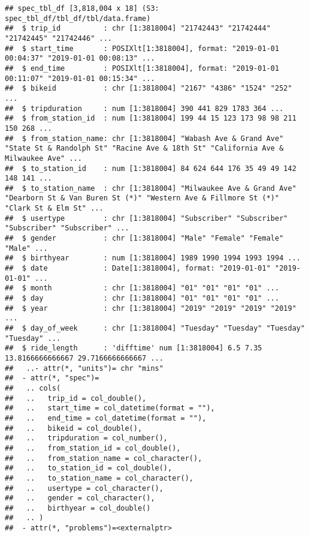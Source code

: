 \documentclass[
]{article}
\newenvironment{Shaded}{\begin{snugshade}}{\end{snugshade}}
\newcommand{\CommentTok}[1]{\textcolor[rgb]{0.56,0.35,0.01}{\textit{#1}}}
\newcommand{\FunctionTok}[1]{\textcolor[rgb]{0.00,0.00,0.00}{#1}}
\newcommand{\NormalTok}[1]{#1}
\newcommand{\SpecialCharTok}[1]{\textcolor[rgb]{0.00,0.00,0.00}{#1}}
\begin{document}
\begin{verbatim}
## spec_tbl_df [3,818,004 x 18] (S3: spec_tbl_df/tbl_df/tbl/data.frame)
##  $ trip_id          : chr [1:3818004] "21742443" "21742444" "21742445" "21742446" ...
##  $ start_time       : POSIXlt[1:3818004], format: "2019-01-01 00:04:37" "2019-01-01 00:08:13" ...
##  $ end_time         : POSIXlt[1:3818004], format: "2019-01-01 00:11:07" "2019-01-01 00:15:34" ...
##  $ bikeid           : chr [1:3818004] "2167" "4386" "1524" "252" ...
##  $ tripduration     : num [1:3818004] 390 441 829 1783 364 ...
##  $ from_station_id  : num [1:3818004] 199 44 15 123 173 98 98 211 150 268 ...
##  $ from_station_name: chr [1:3818004] "Wabash Ave & Grand Ave" "State St & Randolph St" "Racine Ave & 18th St" "California Ave & Milwaukee Ave" ...
##  $ to_station_id    : num [1:3818004] 84 624 644 176 35 49 49 142 148 141 ...
##  $ to_station_name  : chr [1:3818004] "Milwaukee Ave & Grand Ave" "Dearborn St & Van Buren St (*)" "Western Ave & Fillmore St (*)" "Clark St & Elm St" ...
##  $ usertype         : chr [1:3818004] "Subscriber" "Subscriber" "Subscriber" "Subscriber" ...
##  $ gender           : chr [1:3818004] "Male" "Female" "Female" "Male" ...
##  $ birthyear        : num [1:3818004] 1989 1990 1994 1993 1994 ...
##  $ date             : Date[1:3818004], format: "2019-01-01" "2019-01-01" ...
##  $ month            : chr [1:3818004] "01" "01" "01" "01" ...
##  $ day              : chr [1:3818004] "01" "01" "01" "01" ...
##  $ year             : chr [1:3818004] "2019" "2019" "2019" "2019" ...
##  $ day_of_week      : chr [1:3818004] "Tuesday" "Tuesday" "Tuesday" "Tuesday" ...
##  $ ride_length      : 'difftime' num [1:3818004] 6.5 7.35 13.8166666666667 29.7166666666667 ...
##   ..- attr(*, "units")= chr "mins"
##  - attr(*, "spec")=
##   .. cols(
##   ..   trip_id = col_double(),
##   ..   start_time = col_datetime(format = ""),
##   ..   end_time = col_datetime(format = ""),
##   ..   bikeid = col_double(),
##   ..   tripduration = col_number(),
##   ..   from_station_id = col_double(),
##   ..   from_station_name = col_character(),
##   ..   to_station_id = col_double(),
##   ..   to_station_name = col_character(),
##   ..   usertype = col_character(),
##   ..   gender = col_character(),
##   ..   birthyear = col_double()
##   .. )
##  - attr(*, "problems")=<externalptr>
\end{verbatim}

\begin{Shaded}
\end{Shaded}
\end{document}
